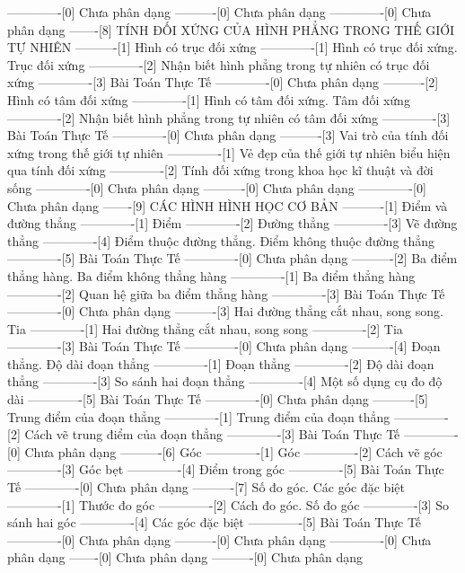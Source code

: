 -------------[0] Chưa phân dạng
----------[0] Chưa phân dạng
-------------[0] Chưa phân dạng
-------[8] TÍNH ĐỐI XỨNG CỦA HÌNH PHẲNG TRONG THẾ GIỚI TỰ NHIÊN
----------[1] Hình có trục đối xứng
-------------[1] Hình có trục đối xứng. Trục đối xứng
-------------[2] Nhận biết hình phẳng trong tự nhiên có trục đối xứng
-------------[3] Bài Toán Thực Tế
-------------[0] Chưa phân dạng
----------[2] Hình có tâm đối xứng
-------------[1] Hình có tâm đối xứng. Tâm đối xứng
-------------[2] Nhận biết hình phẳng trong tự nhiên có tâm đối xứng
-------------[3] Bài Toán Thực Tế
-------------[0] Chưa phân dạng
----------[3] Vai trò của tính đối xứng trong thế giới tự nhiên
-------------[1] Vẻ đẹp của thế giới tự nhiên biểu hiện qua tính đối xứng
-------------[2] Tính đối xứng trong khoa học kĩ thuật và đời sống
-------------[0] Chưa phân dạng
----------[0] Chưa phân dạng
-------------[0] Chưa phân dạng
-------[9] CÁC HÌNH HÌNH HỌC CƠ BẢN
----------[1] Điểm và đường thẳng
-------------[1] Điểm
-------------[2] Đường thẳng
-------------[3] Vẽ đường thẳng
-------------[4] Điểm thuộc đường thẳng. Điểm không thuộc đường thẳng
-------------[5] Bài Toán Thực Tế
-------------[0] Chưa phân dạng
----------[2] Ba điểm thẳng hàng. Ba điểm không thẳng hàng
-------------[1] Ba điểm thẳng hàng
-------------[2] Quan hệ giữa ba điểm thẳng hàng
-------------[3] Bài Toán Thực Tế
-------------[0] Chưa phân dạng
----------[3] Hai đường thẳng cắt nhau, song song. Tia
-------------[1] Hai đường thẳng cắt nhau, song song
-------------[2] Tia
-------------[3] Bài Toán Thực Tế
-------------[0] Chưa phân dạng
----------[4] Đoạn thẳng. Độ dài đoạn thẳng
-------------[1] Đoạn thẳng
-------------[2] Độ dài đoạn thẳng
-------------[3] So sánh hai đoạn thẳng
-------------[4] Một số dụng cụ đo độ dài
-------------[5] Bài Toán Thực Tế
-------------[0] Chưa phân dạng
----------[5] Trung điểm của đoạn thẳng
-------------[1] Trung điểm của đoạn thẳng
-------------[2] Cách vẽ trung điểm của đoạn thẳng
-------------[3] Bài Toán Thực Tế
-------------[0] Chưa phân dạng
----------[6] Góc
-------------[1] Góc
-------------[2] Cách vẽ góc
-------------[3] Góc bẹt
-------------[4] Điểm trong góc
-------------[5] Bài Toán Thực Tế
-------------[0] Chưa phân dạng
----------[7] Số đo góc. Các góc đặc biệt
-------------[1] Thước đo góc
-------------[2] Cách đo góc. Số đo góc
-------------[3] So sánh hai góc
-------------[4] Các góc đặc biệt
-------------[5] Bài Toán Thực Tế
-------------[0] Chưa phân dạng
----------[0] Chưa phân dạng
-------------[0] Chưa phân dạng
-------[0] Chưa phân dạng
----------[0] Chưa phân dạng
